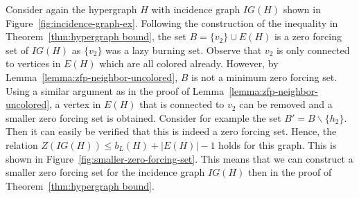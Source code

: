 \documentclass[12pt]{article}
\theoremstyle{plain}
\theoremstyle{definition}
\theoremstyle{remark}
\begin{document}
Consider again the hypergraph $H$ with incidence graph $IG(H)$ shown in Figure~\ref{fig:incidence-graph-ex}. 
Following the construction of the inequality in Theorem~\ref{thm:hypergraph bound}, the set $B=\{v_2\}\cup E(H)$ is a zero forcing set of $IG(H)$ as $\{v_2\}$ was a lazy burning set.
Observe that $v_2$ is only connected to vertices in $E(H)$ which are all colored already. 
However, by Lemma~\ref{lemma:zfp-neighbor-uncolored}, $B$ is not a minimum zero forcing set. Using a similar argument as in the proof of Lemma~\ref{lemma:zfp-neighbor-uncolored}, a vertex in $E(H)$ that is connected to $v_2$ can be removed and a smaller zero forcing set is obtained. Consider for example the set $B'=B\backslash \{h_2\}$. Then it can easily be verified that this is indeed a zero forcing set. 
Hence, the relation $Z(IG(H))\leq b_L(H) + |E(H)|-1$ holds for this graph.
This is shown in Figure~\ref{fig:smaller-zero-forcing-set}. 
This means that we can construct a smaller zero forcing set for the incidence graph $IG(H)$ then in the proof of Theorem~\ref{thm:hypergraph bound}.
\end{document}
